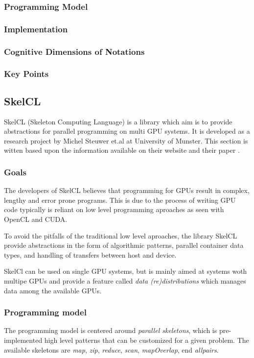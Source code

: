 \subsubsection{Programming Model}

\subsubsection{Implementation}

\subsubsection{Cognitive Dimensions of Notations}

\subsubsection{Key Points}


\subsection{SkelCL}
SkelCL (Skeleton Computing Language) is a library which aim is to provide abstractions for parallel programming on multi GPU systems. It is developed as a research project by Michel Steuwer et.al at University of Munster. This section is witten based upon the information available on their website \cite{skelclWebsite} and their paper \cite{skelclPaper}.

\subsubsection{Goals}
The developers of SkelCL believes that programming for GPUs result in complex, lengthy and error prone programs. This is due to the process of writing GPU code typically is reliant on low level programming aproaches as seen with OpenCL and CUDA. 

To avoid the pitfalls of the traditional low level aproaches, the library SkelCL provide abstractions in the form of algorithmic patterns, parallel container data types, and handling of transfers between host and device. 

SkelCl can be used on single GPU systems, but is mainly aimed at systems woth multipe GPUs and provide a feature called \textit{data (re)distributions} which manages data among the available GPUs.

\subsubsection{Programming model}
The programming model is centered around \textit{parallel skeletons}, which is pre-implemented high level patterns that can be customized for a given problem. The available skeletons are \textit{map}, \textit{zip}, \textit{reduce}, \textit{scan}, \textit{mapOverlap}, end \textit{allpairs}.

